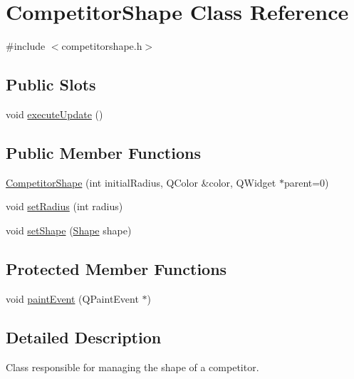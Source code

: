 \hypertarget{class_competitor_shape}{
\section{CompetitorShape Class Reference}
\label{class_competitor_shape}
}


{\ttfamily \#include $<$competitorshape.h$>$}

\subsection*{Public Slots}
\begin{DoxyCompactItemize}
\item 
void \hyperlink{class_competitor_shape_a31047bfe507825f68a8be6f0e049f24d}{executeUpdate} ()
\end{DoxyCompactItemize}
\subsection*{Public Member Functions}
\begin{DoxyCompactItemize}
\item 
\hyperlink{class_competitor_shape_a39e77ba8fc8ff7496fc7bfc49dd4f428}{CompetitorShape} (int initialRadius, QColor \&color, QWidget $\ast$parent=0)
\item 
void \hyperlink{class_competitor_shape_aaf524721fabe4ea41932e0e6f0f7fa40}{setRadius} (int radius)
\item 
void \hyperlink{class_competitor_shape_a76059e0a7e097e44d1fa29c8cdb9ff80}{setShape} (\hyperlink{competitorshape_8h_a55b506070847a13554f8b879c1bfb37c}{Shape} shape)
\end{DoxyCompactItemize}
\subsection*{Protected Member Functions}
\begin{DoxyCompactItemize}
\item 
void \hyperlink{class_competitor_shape_a6500304e1d7e51046e3852b4a04dcbe4}{paintEvent} (QPaintEvent $\ast$)
\end{DoxyCompactItemize}


\subsection{Detailed Description}
Class responsible for managing the shape of a competitor. 


